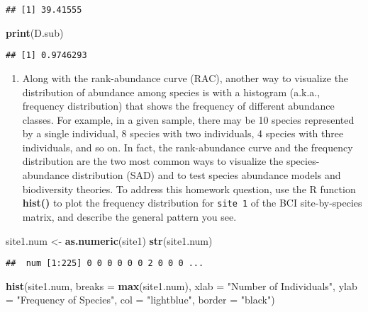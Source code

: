 \documentclass[
]{article}
\newenvironment{Shaded}{\begin{snugshade}}{\end{snugshade}}
\newcommand{\AttributeTok}[1]{\textcolor[rgb]{0.13,0.29,0.53}{#1}}
\newcommand{\FunctionTok}[1]{\textcolor[rgb]{0.13,0.29,0.53}{\textbf{#1}}}
\newcommand{\NormalTok}[1]{#1}
\newcommand{\OtherTok}[1]{\textcolor[rgb]{0.56,0.35,0.01}{#1}}
\newcommand{\StringTok}[1]{\textcolor[rgb]{0.31,0.60,0.02}{#1}}
\providecommand{\tightlist}{%
  \setlength{\itemsep}{0pt}\setlength{\parskip}{0pt}}
\begin{document}
\begin{verbatim}
## [1] 39.41555
\end{verbatim}

\begin{Shaded}
\begin{Highlighting}[]
\FunctionTok{print}\NormalTok{(D.sub)}
\end{Highlighting}
\end{Shaded}

\begin{verbatim}
## [1] 0.9746293
\end{verbatim}

\begin{enumerate}
\def\labelenumi{\arabic{enumi}.}
\setcounter{enumi}{1}
\tightlist
\item
  Along with the rank-abundance curve (RAC), another way to visualize
  the distribution of abundance among species is with a histogram
  (a.k.a., frequency distribution) that shows the frequency of different
  abundance classes. For example, in a given sample, there may be 10
  species represented by a single individual, 8 species with two
  individuals, 4 species with three individuals, and so on. In fact, the
  rank-abundance curve and the frequency distribution are the two most
  common ways to visualize the species-abundance distribution (SAD) and
  to test species abundance models and biodiversity theories. To address
  this homework question, use the R function \textbf{hist()} to plot the
  frequency distribution for \texttt{site\ 1} of the BCI site-by-species
  matrix, and describe the general pattern you see.
\end{enumerate}

\begin{Shaded}
\begin{Highlighting}[]
\NormalTok{site1.num }\OtherTok{\textless{}{-}} \FunctionTok{as.numeric}\NormalTok{(site1)}
\FunctionTok{str}\NormalTok{(site1.num)}
\end{Highlighting}
\end{Shaded}

\begin{verbatim}
##  num [1:225] 0 0 0 0 0 0 2 0 0 0 ...
\end{verbatim}

\begin{Shaded}
\begin{Highlighting}[]
\FunctionTok{hist}\NormalTok{(site1.num, }\AttributeTok{breaks =} \FunctionTok{max}\NormalTok{(site1.num), }
     \AttributeTok{xlab =} \StringTok{"Number of Individuals"}\NormalTok{, }\AttributeTok{ylab =} \StringTok{"Frequency of Species"}\NormalTok{, }\AttributeTok{col =} \StringTok{"lightblue"}\NormalTok{, }\AttributeTok{border =} \StringTok{"black"}\NormalTok{)}
\end{Highlighting}
\end{Shaded}
\end{document}
